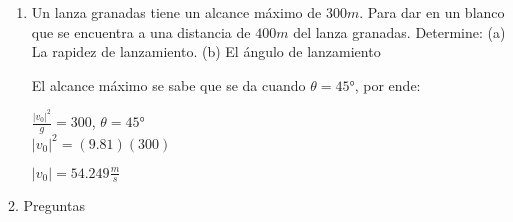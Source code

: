 \documentclass[10pt, a4paper]{article}
\begin{document}
\begin{enumerate}
    \item Un lanza granadas tiene un alcance máximo de $300 \si{m}$. Para dar en un blanco
    que se encuentra a una distancia de $400 \si{m}$ del lanza granadas. Determine: (a) La
    rapidez de lanzamiento. (b) El ángulo de lanzamiento

        \begin{center}

            El alcance máximo se sabe que se da cuando $\theta = \ang{45}$, por ende:

            $\frac{|v_0|^2}{g}=300$, $\theta = \ang{45}$\\
            $|v_0|^2=(9.81)(300)$

            $|v_0|=54.249 \si{\frac{m}{s}}$

        \end{center}
    \end{enumerate}

    2. Preguntas
\end{document}
